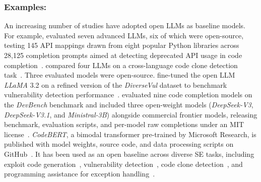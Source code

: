 \documentclass[smallextended]{svjour3}
\newcommand{\guidelinesubsubsection}[1]{\subsubsection{\bfseries #1:}}
\newcommand{\guidelinesubsubsection}[1]{\subsubsection{#1}}
\begin{document}
\guidelinesubsubsection{Examples}

An increasing number of studies have adopted open LLMs as baseline models.
For example, \citeauthor{DBLP:journals/corr/abs-2406-09834} evaluated seven advanced LLMs, six of which were open-source, testing 145 API mappings drawn from eight popular Python libraries across 28,125 completion prompts aimed at detecting deprecated API usage in code completion~\cite{DBLP:journals/corr/abs-2406-09834}.
\citeauthor{DBLP:journals/corr/abs-2408-04430} compared four LLMs on a cross-language code clone detection task~\cite{DBLP:journals/corr/abs-2408-04430}.
Three evaluated models were open-source.
\citeauthor{DBLP:conf/eicc/GoncalvesSC0MPS25} fine-tuned the open LLM \emph{LLaMA} 3.2 on a refined version of the \emph{DiverseVul} dataset to benchmark vulnerability detection performance~\cite{DBLP:conf/eicc/GoncalvesSC0MPS25}.
\citeauthor{DBLP:journals/corr/abs-2601-11895} evaluated nine code completion models on the \emph{DevBench} benchmark and included three open-weight models (\emph{DeepSeek-V3}, \emph{DeepSeek-V3.1}, and \emph{Ministral-3B}) alongside commercial frontier models, releasing benchmark, evaluation scripts, and per-model raw completions under an MIT license~\cite{DBLP:journals/corr/abs-2601-11895}.
\emph{CodeBERT}, a bimodal transformer pre-trained by Microsoft Research, is published with model weights, source code, and data processing scripts on GitHub~\cite{codebert}. It has been used as an open baseline across diverse SE tasks, including exploit code generation~\cite{DBLP:journals/jss/YangZCZHC23}, vulnerability detection~\cite{DBLP:conf/gaiis/XiaSD24}, code clone detection~\cite{DBLP:conf/kbse/SonnekalbGBM22}, and programming assistance for exception handling~\cite{DBLP:conf/icse/CaiYMMN24}.
\end{document}
